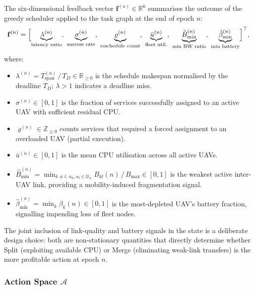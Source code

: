 The six-dimensional feedback vector
$\mathbf{f}^{(n)} \in \mathbb{R}^6$ summarises the outcome of the
greedy scheduler applied to the task graph at the end of epoch $n$:
\begin{equation}
  \mathbf{f}^{(n)} =
  \Bigl[
    \underbrace{\lambda^{(n)}}_{\text{latency ratio}},\;
    \underbrace{\sigma^{(n)}}_{\text{success rate}},\;
    \underbrace{\varrho^{(n)}}_{\text{reschedule count}},\;
    \underbrace{\bar{u}^{(n)}}_{\text{fleet util.}},\;
    \underbrace{\hat{B}_{\min}^{(n)}}_{\text{min BW ratio}},\;
    \underbrace{\hat{\beta}_{\min}^{(n)}}_{\text{min battery}}
  \Bigr]^\top,
  \label{eq:feedback_vec}
\end{equation}
where:
\begin{itemize}[leftmargin=*, itemsep=1pt]
  \item $\lambda^{(n)} = T_{\mathrm{span}}^{(n)}\,/\,T_D \in \mathbb{R}_{\geq 0}$
        is the schedule makespan normalised by the deadline $T_D$;
        $\lambda > 1$ indicates a deadline miss.
  \item $\sigma^{(n)} \in [0,1]$
        is the fraction of services successfully assigned to an
        active UAV with sufficient residual CPU.
  \item $\varrho^{(n)} \in \mathbb{Z}_{\geq 0}$
        counts services that required a forced assignment to an
        overloaded UAV (partial execution).
  \item $\bar{u}^{(n)} \in [0,1]$
        is the mean CPU utilisation across all active UAVs.
  \item $\hat{B}_{\min}^{(n)} = \min_{k \neq l,\,
        u_k,u_l \in \mathcal{U}_a} B_{kl}(n)\,/\,B_{\max} \in [0,1]$
        is the weakest active inter-UAV link, providing a
        mobility-induced fragmentation signal.
  \item $\hat{\beta}_{\min}^{(n)} = \min_k \beta_k(n) \in [0,1]$
        is the most-depleted UAV's battery fraction,
        signalling impending loss of fleet nodes.
\end{itemize}
The joint inclusion of link-quality and battery signals in the state
is a deliberate design choice: both are non-stationary quantities
that directly determine whether Split (exploiting available CPU) or
Merge (eliminating weak-link transfers) is the more profitable action
at epoch $n$.

\subsubsection{Action Space $\mathcal{A}$}
\label{subsubsec:action}

